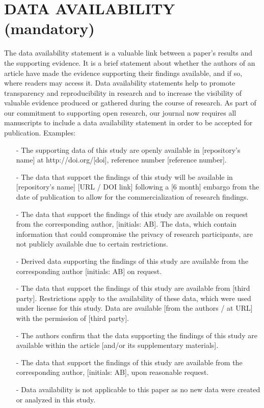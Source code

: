 \documentclass{iaesarticle}
\begin{document}
\section*{DATA AVAILABILITY (mandatory)}
\label{}
The data availability statement is a valuable link between a paper’s results and the supporting evidence. It is a brief statement about whether the authors of an article have made the evidence supporting their findings available, and if so, where readers may access it. Data availability statements help to promote transparency and reproducibility in research and to increase the visibility of valuable evidence produced or gathered during the course of research. As part of our commitment to supporting open research, our journal now requires all manuscripts to include a data availability statement in order to be accepted for publication. Examples:
\begin{itemize}[topsep=0.3ex, itemsep=0.3ex, parsep=0.2ex]
	\item[-] The supporting data of this study are openly available in [repository's name] at http://doi.org/[doi], reference number [reference number].
	\item[-] The data that support the findings of this study will be available in [repository's name] [URL / DOI link] following a [6 month] embargo from the date of publication to allow for the commercialization of research findings.
	\item[-] The data that support the findings of this study are available on request from the corresponding author, [initials: AB]. The data, which contain information that could compromise the privacy of research participants, are not publicly available due to certain restrictions.
	\item[-] Derived data supporting the findings of this study are available from the corresponding author [initials: AB] on request.
	\item[-] The data that support the findings of this study are available from [third party]. Restrictions apply to the availability of these data, which were used under license for this study. Data are available [from the authors / at URL] with the permission of [third party].
	\item[-] The authors confirm that the data supporting the findings of this study are available within the article [and/or its supplementary materials].
	\item[-] The data that support the findings of this study are available from the corresponding author, [initials: AB], upon reasonable request.
	\item[-] Data availability is not applicable to this paper as no new data were created or analyzed in this study.
\end{itemize}
\end{document}
